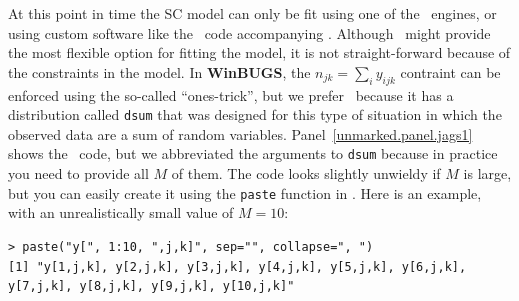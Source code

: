 At this point in time the SC model can only be fit using one of the
\bugs~engines, or using custom software like the \R~code accompanying
\citet{chandler_royle:2012}. Although \bugs~might provide the most
flexible option for fitting the model, it is not
straight-forward because of the
constraints in the model. In \textbf{WinBUGS}, the
$n_{jk} = \sum_i y_{ijk}$
contraint can be
enforced using the so-called ``ones-trick'', but we prefer
\jags~because it has a distribution
called \verb+dsum+ that was designed for this type
of situation in which the observed data are a sum of random
variables. %
Panel~\ref{unmarked.panel.jags1} shows the \jags~code, but
we abbreviated the
arguments to \verb+dsum+ because in practice you need to provide all $M$ of
them. %
The code looks slightly unwieldy if $M$ is large, but you can easily create
it using the \verb+paste+ function in \R. Here is an example, with an
unrealistically small value of $M=10$:
\begin{small}
\begin{verbatim}
> paste("y[", 1:10, ",j,k]", sep="", collapse=", ")
[1] "y[1,j,k], y[2,j,k], y[3,j,k], y[4,j,k], y[5,j,k], y[6,j,k],
y[7,j,k], y[8,j,k], y[9,j,k], y[10,j,k]"
\end{verbatim}
\end{small}

